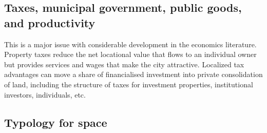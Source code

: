 \subsection{Taxes, municipal government, public goods, and productivity}
This is a major issue with considerable development in the economics literature. Property taxes reduce the net locational value that flows to an individual owner but provides services and wages that make the city attractive. 
Localized tax advantages can move a share of financialised investment into private consolidation of land, 
including the structure of taxes for investment properties, institutional investors, individuals, etc.


\subsection{Typology for space}

